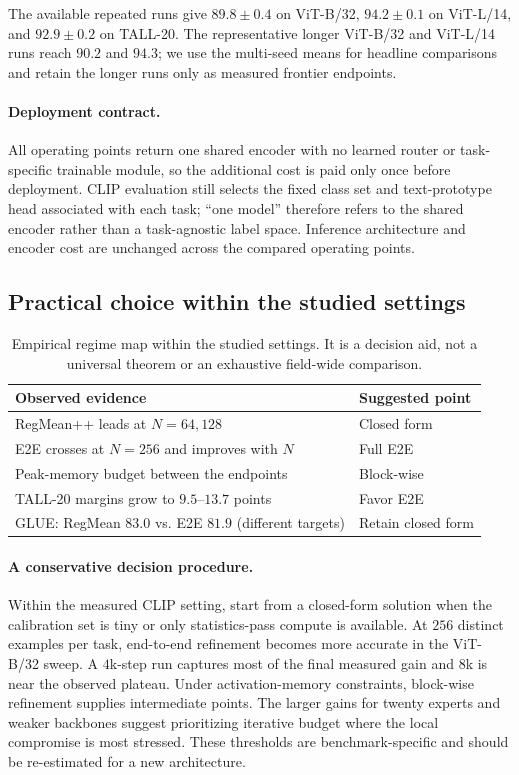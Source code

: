 \documentclass[letterpaper]{article} %
\theoremstyle{plain}
\theoremstyle{definition}
\begin{document}
The available repeated runs give $89.8\pm0.4$ on ViT-B/32, $94.2\pm0.1$ on ViT-L/14, and
$92.9\pm0.2$ on TALL-20. The representative longer ViT-B/32 and ViT-L/14 runs reach
$90.2$ and $94.3$; we use the multi-seed means for headline comparisons and retain the
longer runs only as measured frontier endpoints.

\paragraph{Deployment contract.}
All operating points return one shared encoder with no learned router or task-specific
trainable module, so the additional cost is paid only once before deployment. CLIP
evaluation still selects the fixed class set and text-prototype head associated with each
task; ``one model'' therefore refers to the shared encoder rather than a task-agnostic label
space. Inference architecture and encoder cost are unchanged across the compared operating
points.

\subsection{Practical choice within the studied settings}

\begin{table}[tb]
\centering
\small
\setlength{\tabcolsep}{4pt}
\begin{tabular}{p{}p{}}
\toprule
Observed evidence & Suggested point \\
\midrule
RegMean++ leads at $N=64,128$ & Closed form \\
E2E crosses at $N=256$ and improves with $N$ & Full E2E \\
Peak-memory budget between the endpoints & Block-wise \\
TALL-20 margins grow to $9.5$--$13.7$ points & Favor E2E \\
GLUE: RegMean $83.0$ vs. E2E $81.9$ (different targets) & Retain closed form \\
\bottomrule
\end{tabular}
\caption{Empirical regime map within the studied settings. It is a decision aid, not a
universal theorem or an exhaustive field-wide comparison.}
\label{tab:regime-map}
\end{table}

\paragraph{A conservative decision procedure.}
Within the measured CLIP setting, start from a closed-form solution when the calibration set
is tiny or only statistics-pass compute is available. At $256$ distinct examples per task,
end-to-end refinement becomes more accurate in the ViT-B/32 sweep. A $4$k-step run captures
most of the final measured gain and $8$k is near the observed plateau. Under activation-memory
constraints, block-wise refinement supplies intermediate points. The larger gains for twenty
experts and weaker backbones suggest prioritizing iterative budget where the local compromise
is most stressed. These thresholds are benchmark-specific and should be re-estimated for a new
architecture.
\end{document}
